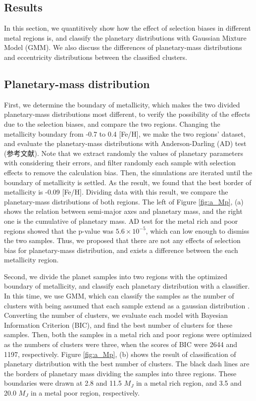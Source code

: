 \documentclass[twocolumn, dvipdfmx]{aastex62}
\begin{document}
\begin{CJK*}{UTF8}{min}
\section{Results} \label{sec:results}

In this section, we quantitively show how the effect of selection biases in different metal regions is, and classify the planetary distributions with Gaussian Mixture Model (GMM). We also discuss the differences of planetary-mass distributions and eccentricity distributions between the classified clusters.


\subsection{Planetary-mass distribution} \label{subsec:mass}

First, we determine the boundary of metallicity, which makes the two divided planetary-mass distributions most different, to verify the possibility of the effects due to the selection biases, and compare the two regions. Changing the metallicity boundary from -0.7 to 0.4 [Fe/H], we make the two regions' dataset, and evaluate the planetary-mass distributions with Anderson-Darling (AD) test (参考文献). Note that we extract randomly the values of planetary parameters with considering their errors, and filter randomly each sample with selection effects to remove the calculation bias. Then, the simulations are iterated until the boundary of metallicity is settled. As the result, we found that the best border of metallicity is -0.09 [Fe/H]. Dividing data with this result, we compare the planetary-mass distributions of both regions. The left of Figure \ref{fig:a_Mp}, (a) shows the relation between semi-major axes and planetary mass, and the right one is the cumulative of planetary mass. AD test for the metal rich and poor regions showed that the p-value was $5.6\times10^{-5}$, which can low enough to dismiss the two samples. Thus, we proposed that there are not any effects of selection bias for planetary-mass distribution, and exists a difference between the each metallicity region.

Second, we divide the planet samples into two regions with the optimized boundary of metallicity, and classify each planetary distribution with a classifier. In this time, we use GMM, which can classify the samples as the number of clusters with being assumed that each sample extend as a gaussian distribution \citep[e.g.,][]{2012MNRAS.424.2832L}. Converting the number of clusters, we evaluate each model with Bayesian Information Criterion (BIC), and find the best number of clusters for these samples. Then, both the samples in a metal rich and poor regions were optimized as the numbers of clusters were three, when the scores of BIC were 2644 and 1197, respectively.  Figure \ref{fig:a_Mp}, (b) shows the result of classification of planetary distribution with the best number of clusters. The black dash lines are the borders of planetary mass dividing the samples into three regions. These boundaries were drawn at 2.8 and 11.5 $M_J$ in a metal rich region, and 3.5 and 20.0 $M_J$ in a metal poor region, respectively.


\end{CJK*}
\end{document}
